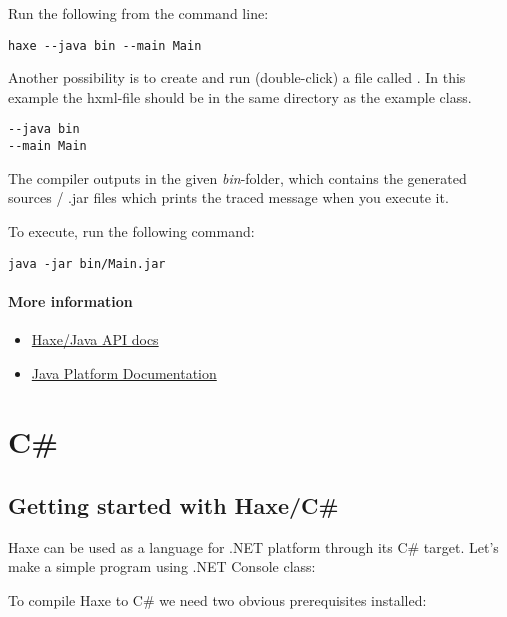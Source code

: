 Run the following from the command line:

\begin{lstlisting}
haxe --java bin --main Main
\end{lstlisting}

Another possibility is to create and run (double-click) a file called . In this example the hxml-file should be in the same directory as the example class.

\begin{lstlisting}
--java bin
--main Main
\end{lstlisting}

The compiler outputs in the given \emph{bin}-folder, which contains the generated sources / .jar files which prints the traced message when you execute it. 

To execute, run the following command:

\begin{lstlisting}
java -jar bin/Main.jar
\end{lstlisting}

\paragraph{More information}

\begin{itemize}
	\item \href{https://api.haxe.org/java/}{Haxe/Java API docs}
	\item \href{https://docs.oracle.com/javase/}{Java Platform Documentation}
\end{itemize}


\section{C\#}
\label{target-cs}

\subsection{Getting started with Haxe/C\#}
\label{target-cs-getting-started}

Haxe can be used as a language for .NET platform through its C\# target. Let's make a simple program using .NET Console class:


To compile Haxe to C\# we need two obvious prerequisites installed:

